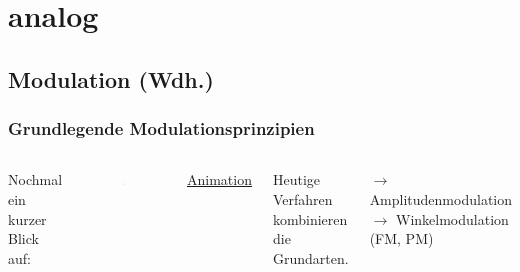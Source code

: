 \section{analog}

\subsection{Modulation (Wdh.)}

\begin{frame}
  \frametitle{Grundlegende Modulationsprinzipien}

  \begin{columns}

    Nochmal ein kurzer Blick auf:
    \begin{center}
      \begin{figure}
        \includegraphics[width=\textwidth,height=.5\textheight,keepaspectratio]{e14/modulationen.jpg}\\
      \end{figure}
    \end{center}

    \href{https://upload.wikimedia.org/wikipedia/commons/a/a4/Amfm3-en-de.gif}{\ExternalLink Animation}


    \bigskip

    Heutige Verfahren kombinieren die Grundarten.

    \bigskip

    $\rightarrow$ Amplitudenmodulation \\
    $\rightarrow$ Winkelmodulation (FM, PM)

  \end{columns}

\end{frame}


